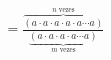 \documentclass[preview]{standalone}
\begin{document}
\begin{align*}
=\frac{\overbrace{(a \cdot a \cdot a \cdot a \cdot a \cdots a)}^{n \text{ vezes}}}{ \underbrace{(a \cdot a \cdot a \cdot a \cdots a)}_{m \text{ vezes}}}
\end{align*}
\end{document}
